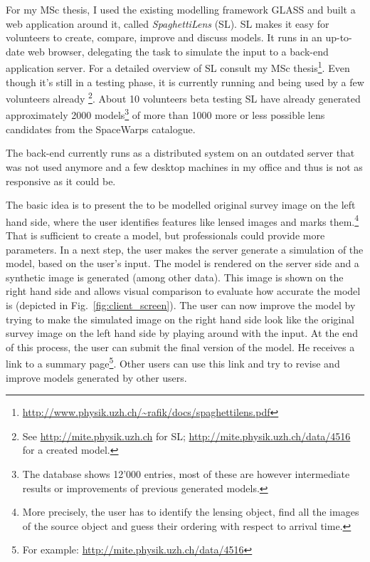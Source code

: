 \documentclass[11pt]{article}
\begin{document}
For my MSc thesis\cite{mscth}, I used the existing modelling framework GLASS\cite{glass2, glass} and built a web application around it, called \emph{SpaghettiLens} (SL).
SL makes it easy for volunteers to create, compare, improve and discuss models.
It runs in an up-to-date web browser, delegating the task to simulate the input to a back-end application server.
For a detailed overview of SL consult my MSc thesis\footnote{\url{http://www.physik.uzh.ch/~rafik/docs/spaghettilens.pdf}}.
Even though it's still in a testing phase, it is currently running and being used by a few volunteers already
\footnote{See \url{http://mite.physik.uzh.ch} for SL; \url{http://mite.physik.uzh.ch/data/4516} for a created model.}.
About 10 volunteers beta testing SL have already generated approximately 2000 models\footnote{The database shows 12'000 entries, most of these are however intermediate results or improvements of previous generated models.} of more than 1000 more or less possible lens candidates from the SpaceWarps catalogue.

The back-end currently runs as a distributed system on an outdated server that was not used anymore and a few desktop machines in my office and thus is not as responsive as it could be.

The basic idea is to present the to be modelled original survey image on the left hand side, where the user identifies features like lensed images and marks them.\footnote{More precisely, the user has to identify the lensing object, find all the images of the source object and guess their ordering with respect to arrival time.}
That is sufficient to create a model, but professionals could provide more parameters.
In a next step, the user makes the server generate a simulation of the model, based on the user's input.
The model is rendered on the server side and a synthetic image is generated (among other data).
This image is shown on the right hand side and allows visual comparison to evaluate how accurate the model is (depicted in Fig.~\ref{fig:client_screen}).
The user can now improve the model by trying to make the simulated image on the right hand side look like the original survey image on the left hand side by playing around with the input.
At the end of this process, the user can submit the final version of the model.
He receives a link to a summary page\footnote{For example: \url{http://mite.physik.uzh.ch/data/4516}}.
Other users can use this link and try to revise and improve models generated by other users.
\end{document}
